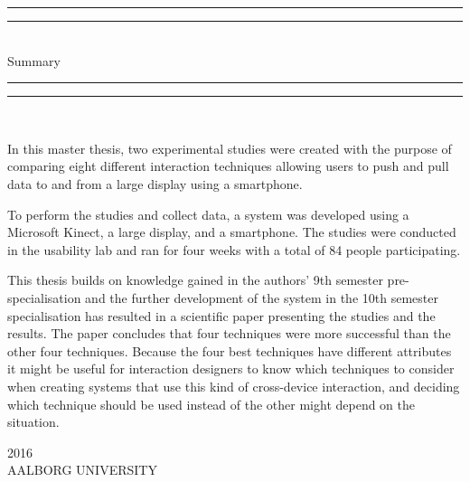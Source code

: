 \begin{dummy}

	\textheight
	\centering
	\vspace*{\baselineskip}
	\rule{\textwidth}{2pt}\vspace*{-\baselineskip}\vspace*{2pt}
	\rule{\textwidth}{0.4pt}\\[\baselineskip]
	{\LARGE Summary}\\[0.2\baselineskip]
	\rule{\textwidth}{0.4pt}\vspace*{-\baselineskip}\vspace{3.2pt}
	\rule{\textwidth}{2pt}\\[\baselineskip]
	\scshape
	{} \par
	\vspace*{2\baselineskip}
	\vspace*{2\baselineskip}

\begin{summary}
In this master thesis, two experimental studies were created with the purpose of comparing eight different interaction techniques allowing users to push and pull data to and from a large display using a smartphone.

To perform the studies and collect data, a system was developed using a Microsoft Kinect, a large display, and a smartphone.
The studies were conducted in the usability lab and ran for four weeks with a total of 84 people participating. 

This thesis builds on knowledge gained in the authors' 9th semester pre-specialisation and the further development of the system in the 10th semester specialisation has resulted in a scientific paper presenting the studies and the results.
The paper concludes that four techniques were more successful than the other four techniques.
Because the four best techniques have different attributes it might be useful for interaction designers to know which techniques to consider when creating systems that use this kind of cross-device interaction, and deciding which technique should be used instead of the other might depend on the situation.
\end{summary}
	\vspace*{2\baselineskip}
		{\scshape 2016} \\
		{\large AALBORG UNIVERSITY}\par
	
\end{dummy}